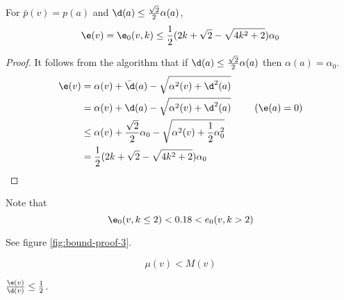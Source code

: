 \begin{lemma}
\label{lem:error-base-case}
For $\bar{p}(v) = p(a)$ and $\d(a) \le \frac{\sqrt{2}}{2}\alpha(a)$,
\begin{equation}
\label{eqn:e0}
\e(v) = \e_0(v,k) \le \frac{1}{2}(2k+\sqrt{2}-\sqrt{4k^2+2})\alpha_0
\end{equation}
\end{lemma}
\begin{proof}
It follows from the algorithm that if $\d(a) \le \frac{\sqrt{2}}{2}\alpha(a)$ then $\alpha(a) = \alpha_0$.
\begin{alignat*}{5}
\e(v) &= \alpha(v) + \bar{\d}(a) - \sqrt{\alpha^2(v)+\d^2(a)} \\
      &= \alpha(v) + \d(a) - \sqrt{\alpha^2(v)+\d^2(a)} 
         & \hspace{5mm}(\e(a) = 0) \\
      &\le \alpha(v) + \frac{\sqrt{2}}{2}\alpha_0 - \sqrt{\alpha^2(v)+\frac{1}{2}\alpha_0^2} \\
      &= \frac{1}{2}(2k+\sqrt{2}-\sqrt{4k^2+2})\alpha_0
\end{alignat*}
\end{proof}

Note that
\begin{equation}
\label{eqn:e0-ineq}
\e_0(v,k\le2) < 0.18 < e_0(v,k>2)
\end{equation}

\begin{lemma}
\label{lem:intersecting-circles}
See figure \ref{fig:bound-proof-3}.

\[
\mu(v) < M(v)
\]
\end{lemma}

\begin{theorem}
$\frac{\e(v)}{\d(v)} \le \frac{1}{2}$.
\end{theorem}

